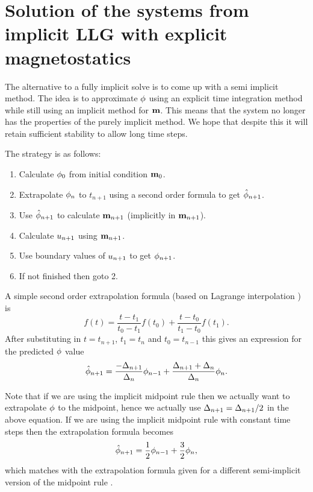 \section{Solution of the systems from implicit LLG with explicit magnetostatics}
\label{sec:semi-implicit-bem}

The alternative to a fully implicit solve is to come up with a semi implicit method.
The idea is to approximate $\phi$ using an explicit time integration method while still using an implicit method for $\mathbf{m}$.
This means that the system no longer has the properties of the purely implicit method.
We hope that despite this it will retain sufficient stability to allow long time steps.

The strategy is as follows:
\begin{enumerate}
\item Calculate $\phi_0$ from initial condition $\mathbf{m}_0$.
\item Extrapolate $\phi_n$ to $t_{n+1}$ using a second order formula to get $\hat{\phi}_{n+1}$.
\item Use $\hat{\phi}_{n+1}$ to calculate $\mathbf{m}_{n+1}$ (implicitly in $\mathbf{m}_{n+1}$).
\item Calculate $u_{n+1}$ using $\mathbf{m}_{n+1}$.
\item Use boundary values of $u_{n+1}$ to get $\phi_{n+1}$.
\item If not finished then goto 2.
\end{enumerate}

A simple second order extrapolation formula (based on Lagrange interpolation \cite[312]{Kincaid2002}) is 
\begin{equation}
  \label{eq:65}
  f(t) = \frac{t - t_1}{t_0 - t_1}f(t_0) + \frac{t - t_0}{t_1 - t_0}f(t_1).
\end{equation}
After substituting in $t=t_{n+1}$, $t_1=t_n$ and $t_0=t_{n-1}$ this gives an expression for the predicted $\phi$ value
\begin{equation}
  \label{eq:66}
  \hat{\phi}_{n+1} = \frac{-\Delta_{n+1}}{\Delta_{n}} \phi_{n-1} + \frac{\Delta_{n+1} + \Delta_{n}}{\Delta_{n}} \phi_n.
\end{equation}

Note that if we are using the implicit midpoint rule then we actually want to extrapolate $\phi$ to the midpoint, hence we actually use $\Delta_{n+1} = \Delta_{n+1} /2$ in the above equation.
If we are using the implicit midpoint rule with constant time steps then the extrapolation formula becomes
\begin{equation}
  \label{eq:67}
  \hat{\phi}_{n+1} = \frac{1}{2} \phi_{n-1} + \frac{3}{2} \phi_n,
\end{equation}
which matches with the extrapolation formula given for a different semi-implicit version of the midpoint rule \cite{Serpico2001}.

